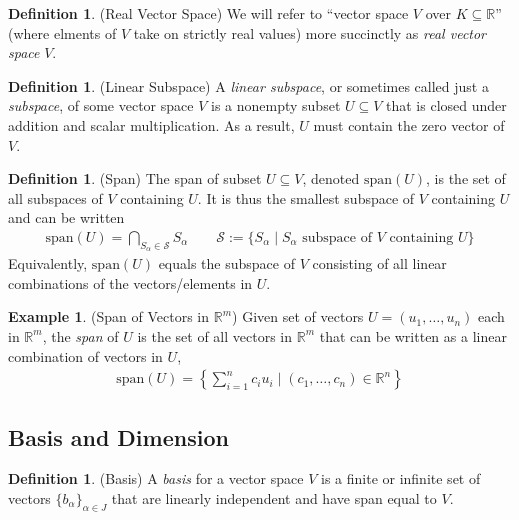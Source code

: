 \documentclass[12pt]{book}
\numberwithin{equation}{section} %
\theoremstyle{plain}
\theoremstyle{definition}
\newtheorem{defn}[thm]{Definition}
\newtheorem{ex}[thm]{Example}
\theoremstyle{remark}
\newcommand{\calS}{\mathcal{S}}
\newcommand{\R}{\mathbb{R}}
\newcommand{\Rm}{\mathbb{R}^m}
\begin{document}
\begin{defn}(Real Vector Space)
We will refer to ``vector space $V$ over $K\subseteq\R$'' (where elments
of $V$ take on strictly real values) more succinctly as
\emph{real vector space} $V$.
\end{defn}

\begin{defn}(Linear Subspace)
A \emph{linear subspace}, or sometimes called just a \emph{subspace}, of
some vector space $V$ is a nonempty subset $U\subseteq V$ that is closed
under addition and scalar multiplication.
As a result, $U$ must contain the zero vector of $V$.
\end{defn}


\begin{defn}(Span)
The span of subset $U\subseteq V$, denoted $\text{span}(U)$, is the set
of all subspaces of $V$ containing $U$.
It is thus the smallest subspace of $V$ containing $U$ and can be
written
\begin{align*}
   \text{span}(U)
  =
  \bigcap_{S_\alpha \in \calS}
  S_\alpha
  \qquad
  \calS
  :=
  \{
  S_\alpha
  \;|\;
  \text{$S_\alpha$ subspace of $V$ containing $U$}
  \}
\end{align*}
Equivalently, $\text{span}(U)$ equals the subspace of $V$ consisting of
all linear combinations of the vectors/elements in $U$.
\end{defn}


\begin{ex}(Span of Vectors in $\Rm$)
Given set of vectors $U=(u_1,\ldots,u_n)$ each in $\Rm$, the
\emph{span} of $U$ is the set of all vectors in $\Rm$ that can be
written as a linear combination of vectors in $U$,
\begin{align*}
  \text{span}(U)
  =
  \left\{
    \sum_{i=1}^n c_iu_i
    \;|\; (c_1,\ldots,c_n)\in\R^n
  \right\}
\end{align*}
\end{ex}




\subsection{Basis and Dimension}


\begin{defn}(Basis)
A \emph{basis} for a vector space $V$ is a finite or infinite set of
vectors $\{b_\alpha\}_{\alpha\in J}$ that are linearly independent and
have span equal to $V$.
\end{defn}
\end{document}
